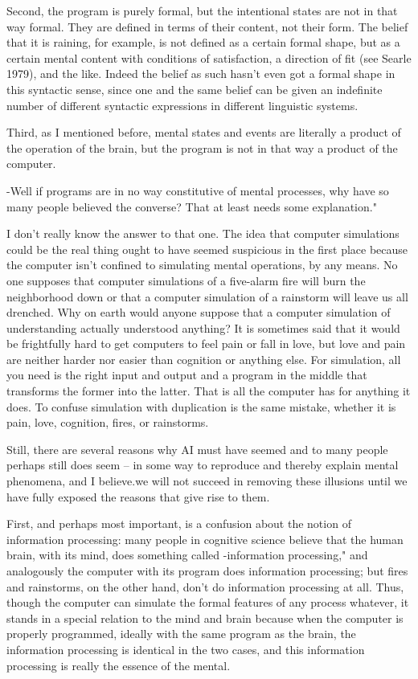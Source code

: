 Second, the program is purely formal, but the intentional states are not in that way formal. They are defined in
terms of their content, not their form. The belief that it is raining, for example, is not defined as a certain formal
shape, but as a certain mental content with conditions of satisfaction, a direction of fit (see Searle 1979), and the
like. Indeed the belief as such hasn't even got a formal shape in this syntactic sense, since one and the same
belief can be given an indefinite number of different syntactic expressions in different linguistic systems.

Third, as I mentioned before, mental states and events are literally a product of the operation of the brain, but
the program is not in that way a product of the computer.

-Well if programs are in no way constitutive of mental processes, why have so many people believed the
converse? That at least needs some explanation."

I don't really know the answer to that one. The idea that computer simulations could be the real thing ought to
have seemed suspicious in the first place because the computer isn't confined to simulating mental operations, by
any means. No one supposes that computer simulations of a five-alarm fire will burn the neighborhood down or
that a computer simulation of a rainstorm will leave us all drenched. Why on earth would anyone suppose that a
computer simulation of understanding actually understood anything? It is sometimes said that it would be
frightfully hard to get computers to feel pain or fall in love, but love and pain are neither harder nor easier than
cognition or anything else. For simulation, all you need is the right input and output and a program in the middle
that transforms the former into the latter. That is all the computer has for anything it does. To confuse simulation
with duplication is the same mistake, whether it is pain, love, cognition, fires, or rainstorms.

Still, there are several reasons why AI must have seemed and to many people perhaps still does seem -- in
some way to reproduce and thereby explain mental phenomena, and I believe.we will not succeed in removing
these illusions until we have fully exposed the reasons that give rise to them.

First, and perhaps most important, is a confusion about the notion of information processing: many people in
cognitive science believe that the human brain, with its mind, does something called -information processing,"
and analogously the computer with its program does information processing; but fires and rainstorms, on the
other hand, don't do information processing at all. Thus, though the computer can simulate the formal features
of any process whatever, it stands in a special relation to the mind and brain because when the computer is
properly programmed, ideally with the same program as the brain, the information processing is identical in the
two cases, and this information processing is really the essence of the mental.

